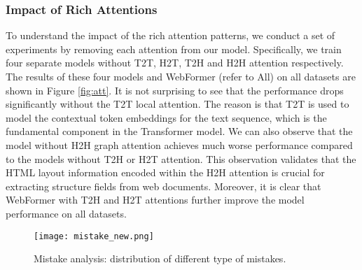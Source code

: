 \documentclass[sigconf]{acmart}
\begin{document}
\subsubsection{Impact of Rich Attentions}
To understand the impact of the rich attention patterns, we conduct a set of experiments by removing each attention from our model. Specifically, we train four separate models without T2T, H2T, T2H and H2H attention respectively.
The results of these four models and WebFormer (refer to All) on all datasets are shown in Figure \ref{fig:att}. It is not surprising to see that the performance drops significantly without the T2T local attention. The reason is that T2T is used to model the contextual token embeddings for the text sequence, which is the fundamental component in the Transformer model.
We can also observe that the model without H2H graph attention achieves much worse performance compared to the models without T2H or H2T attention. This observation validates that the HTML layout information encoded within the H2H attention is crucial for extracting structure fields from web documents. Moreover, it is clear that WebFormer with T2H and H2T attentions further improve the model performance on all datasets.
\begin{figure}
\centering
\texttt{[image: mistake\_new.png]}
\caption{Mistake analysis: distribution of different type of mistakes.} \label{fig:mistake}
\end{figure}
\end{document}
